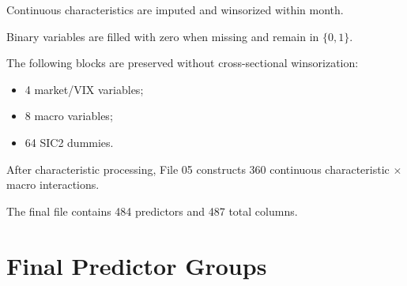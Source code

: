 \documentclass[11pt,a4paper]{article}
\begin{document}
Continuous characteristics are imputed and winsorized within month.

Binary variables are filled with zero when missing and remain in
\(\{0,1\}\).

The following blocks are preserved without cross-sectional winsorization:

\begin{itemize}
  \item 4 market/VIX variables;
  \item 8 macro variables;
  \item 64 SIC2 dummies.
\end{itemize}

After characteristic processing, File 05 constructs 360 continuous
characteristic \(\times\) macro interactions.

The final file contains 484 predictors and 487 total columns.


\section{Final Predictor Groups}
\end{document}

